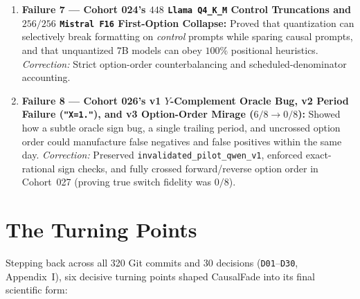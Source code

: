 \begin{enumerate}
  \item \textbf{Failure 7 --- Cohort 024's $448$ \texttt{Llama Q4\_K\_M} Control Truncations and $256/256$ \texttt{Mistral F16} First-Option Collapse:} Proved that quantization can selectively break formatting on \emph{control} prompts while sparing causal prompts, and that unquantized 7B models can obey $100\%$ positional heuristics. \emph{Correction:} Strict option-order counterbalancing and scheduled-denominator accounting.
  \item \textbf{Failure 8 --- Cohort 026's v1 $Y$-Complement Oracle Bug, v2 Period Failure (\texttt{"X=1."}), and v3 Option-Order Mirage ($6/8 \to 0/8$):} Showed how a subtle oracle sign bug, a single trailing period, and uncrossed option order could manufacture false negatives and false positives within the same day. \emph{Correction:} Preserved \texttt{invalidated\_pilot\_qwen\_v1}, enforced exact-rational sign checks, and fully crossed forward/reverse option order in Cohort~027 (proving true switch fidelity was $0/8$).
\end{enumerate}

\chapter{The Turning Points}\label{ch:turning_points}

Stepping back across all 320 Git commits and 30 decisions (\texttt{D01}--\texttt{D30}, Appendix~I), six decisive turning points shaped CausalFade into its final scientific form:

